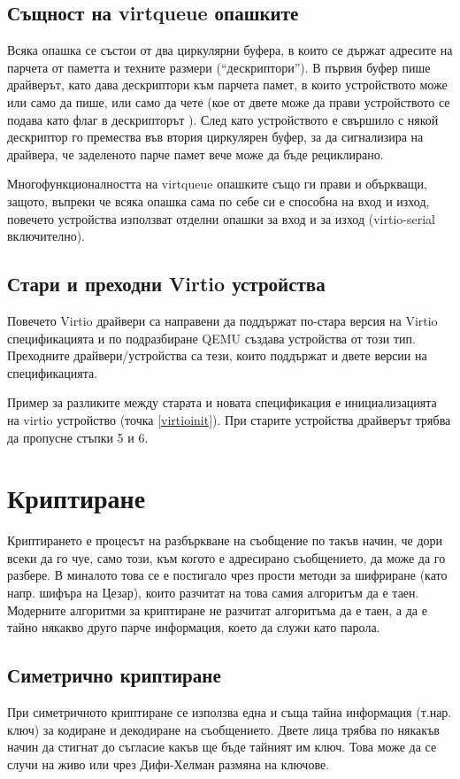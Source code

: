   \subsection{Същност на virtqueue опашките}
  Всяка опашка се състои от два циркулярни буфера, в които се държат адресите на парчета от паметта и техните размери (``дескриптори'').\cite[глава~2]{virtiodocs} В първия буфер пише драйверът, като дава дескриптори към парчета памет, в които устройството може или само да пише, или само да чете (кое от двете може да прави устройството се подава като флаг в дескрипторът \cite[глава~2.4.5]{virtiodocs}). След като устройството е свършило с някой дескриптор го премества във втория циркулярен буфер, за да сигнализира на драйвера, че заделеното парче памет вече може да бъде рециклирано.

  Многофункционалността на virtqueue опашките също ги прави и объркващи, защото, въпреки че всяка опашка сама по себе си е способна на вход и изход, повечето устройства използват отделни опашки за вход и за изход (virtio-serial включително).

  \subsection{Стари и преходни Virtio устройства}
  Повечето Virtio драйвери са направени да поддържат по-стара версия на Virtio спецификацията и по подразбиране QEMU създава устройства от този тип. Преходните драйвери/устройства са тези, които поддържат и двете версии на спецификацията.

  Пример за разликите между старата и новата спецификация е инициализацията на virtio устройство (точка \ref{virtioinit}). При старите устройства драйверът трябва да пропусне стъпки 5 и 6.\cite[глава~3.1.2]{virtiodocs}

\section{Криптиране}
Криптирането е процесът на разбъркване на съобщение по такъв начин, че дори всеки да го чуе, само този, към когото е адресирано съобщението, да може да го разбере. В миналото това се е постигало чрез прости методи за шифриране (като напр. шифъра на Цезар), които разчитат на това самия алгоритъм да е таен. Модерните алгоритми за криптиране не разчитат алгоритъма да е таен, а да е тайно някакво друго парче информация, което да служи като парола.

  \subsection{Симетрично криптиране}
  При симетричното криптиране се използва една и съща тайна информация (т.нар. ключ) за кодиране и декодиране на съобщението. Двете лица трябва по някакъв начин да стигнат до съгласие какъв ще бъде тайният им ключ. Това може да се случи на живо или чрез Дифи-Хелман размяна на ключове.

